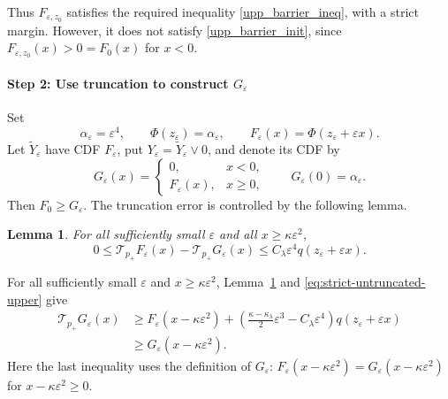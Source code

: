 \documentclass[12pt,preprint]{amsart}
\numberwithin{equation}{section}
\theoremstyle{plain}
\newtheorem{lemma}[theorem]{Lemma}
\theoremstyle{definition}
\begin{document}
Thus $F_{\varepsilon,z_0}$ satisfies the required inequality \eqref{upp_barrier_ineq}, with a
strict margin.  However, it does not satisfy \eqref{upp_barrier_init}, since
$F_{\varepsilon,z_0}(x)>0=F_0(x)$ for $x<0$.

\paragraph*{Step 2: Use truncation to construct $G_\varepsilon$}
Set
\begin{equation*}
 \alpha_\varepsilon=\varepsilon^4,
 \qquad
 \Phi(z_\varepsilon)=\alpha_\varepsilon,
 \qquad
 F_\varepsilon(x)=\Phi(z_\varepsilon+\varepsilon x).
\end{equation*}
Let $\widetilde Y_\varepsilon$ have CDF $F_\varepsilon$, put $Y_\varepsilon=\widetilde Y_\varepsilon\vee0$, and denote its
CDF by
\begin{equation*}
 G_\varepsilon(x)=
 \begin{cases}
 0,&x<0,\\
 F_\varepsilon(x),&x\ge0,
 \end{cases}
 \qquad G_\varepsilon(0)=\alpha_\varepsilon.
\end{equation*}
Then $F_0\ge G_\varepsilon$.  The truncation error is controlled by the
following lemma.

\begin{lemma}
\label{lem:upper-cutoff-error}
For all sufficiently small $\varepsilon$ and all
$x\ge\kappa\varepsilon^2$,
\begin{equation}
 0\le
 \mathcal T_{p_+}F_\varepsilon(x)
 -\mathcal T_{p_+}G_\varepsilon(x)
 \le C_{\lambda}\varepsilon^4q(z_\varepsilon+\varepsilon x).
 \label{eq:upper-operator-cutoff-error}
\end{equation}
\end{lemma}

For all sufficiently small $\varepsilon$ and
$x\ge\kappa\varepsilon^2$, Lemma~\ref{lem:upper-cutoff-error} and
\eqref{eq:strict-untruncated-upper} give
\[
\begin{aligned}
 \mathcal T_{p_+}G_\varepsilon(x)
 &\ge F_\varepsilon(x-\kappa\varepsilon^2)+\left(
     \frac{\kappa-\kappa_{\lambda}}2\varepsilon^3
     -C_{\lambda}\varepsilon^4
   \right)q(z_\varepsilon+\varepsilon x)\\
 &\ge G_\varepsilon(x-\kappa\varepsilon^2).
\end{aligned}
\]
Here the last inequality uses the definition of $G_\varepsilon$:
\(
 F_\varepsilon(x-\kappa\varepsilon^2)
 =G_\varepsilon(x-\kappa\varepsilon^2)
\)
for $x-\kappa\varepsilon^2\ge0.$
\end{document}
